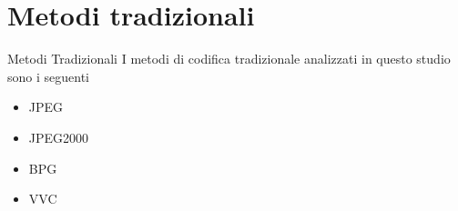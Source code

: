 \section{Metodi tradizionali}

    \begin{frame}{Metodi Tradizionali}
        I metodi di codifica tradizionale analizzati in questo studio sono i seguenti
        \begin{itemize}
            \item JPEG\footnotemark[1]
            \item JPEG2000\footnotemark[2]
            \item BPG\footnotemark[3]
            \item VVC\footnotemark[4]
        \end{itemize}
    \end{frame}
    